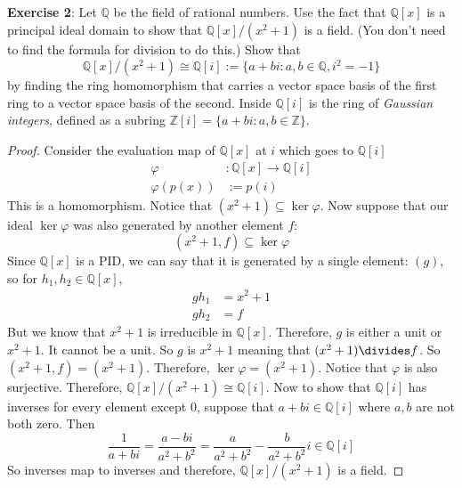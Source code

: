 \documentclass{article}
\begin{document}
\textbf{Exercise 2}: Let $\mathbb{Q}$ be the field of rational numbers. Use the fact that $\mathbb{Q}[x]$ is a principal ideal domain to show that $\mathbb{Q}[x]/(x^{2} + 1)$ is a field. (You don't need to find the formula for division to do this.) Show that
    \begin{equation*}
        \mathbb{Q}[x]/(x^{2} + 1) \cong \mathbb{Q}[i] := \{a + bi : a, b \in \mathbb{Q}, i^{2} = -1\}
    \end{equation*}
by finding the ring homomorphism that carries a vector space basis of the first ring to a vector space basis of the second. Inside $\mathbb{Q}[i]$ is the ring of \textit{Gaussian integers}, defined as a subring $\mathbb{Z}[i] = \{a + bi : a, b \in \mathbb{Z}\}$.
    \begin{proof}
        Consider the evaluation map of $\mathbb{Q}[x]$ at $i$ which goes to $\mathbb{Q}[i]$
            \begin{align*}
                \varphi &: \mathbb{Q}[x] \rightarrow \mathbb{Q}[i] \\
                \varphi(p(x)) &:= p(i)
            \end{align*}
        This is a homomorphism. Notice that $(x^{2} + 1) \subseteq \ker{\varphi}$. Now suppose that our ideal $\ker{\varphi}$ was also generated by another element $f$:
            \begin{equation*}
                (x^{2} + 1, f) \subseteq \ker{\varphi}
            \end{equation*}
        Since $\mathbb{Q}[x]$ is a PID, we can say that it is generated by a single element: $(g)$, so for $h_{1}, h_{2} \in \mathbb{Q}[x]$,
            \begin{align*}
                gh_{1} &= x^{2} + 1 \\
                gh_{2} &= f           
            \end{align*}
        But we know that $x^{2} + 1$ is irreducible in $\mathbb{Q}[x]$. Therefore, $g$ is either a unit or $x^{2} + 1$. It cannot be a unit. So $g$ is $x^{2} + 1$ meaning that $(x^{2} + 1) \divides f$. So $(x^{2} + 1, f) = (x^{2} + 1)$. Therefore, $\ker{\varphi} = (x^{2} + 1)$. Notice that $\varphi$ is also surjective. Therefore, $\mathbb{Q}[x]/(x^{2} + 1) \cong \mathbb{Q}[i]$. Now to show that $\mathbb{Q}[i]$ has inverses for every element except $0$, suppose that $a + bi \in \mathbb{Q}[i]$ where $a, b$ are not both zero. Then
            \begin{equation*}
                \dfrac{1}{a + bi} = \dfrac{a - bi}{a^{2} + b^{2}} = \dfrac{a}{a^{2} + b^{2}} - \dfrac{b}{a^{2} + b^{2}} i \in \mathbb{Q}[i]
            \end{equation*}
        So inverses map to inverses and therefore, $\mathbb{Q}[x]/(x^{2} + 1)$ is a field.
    \end{proof}
\end{document}
